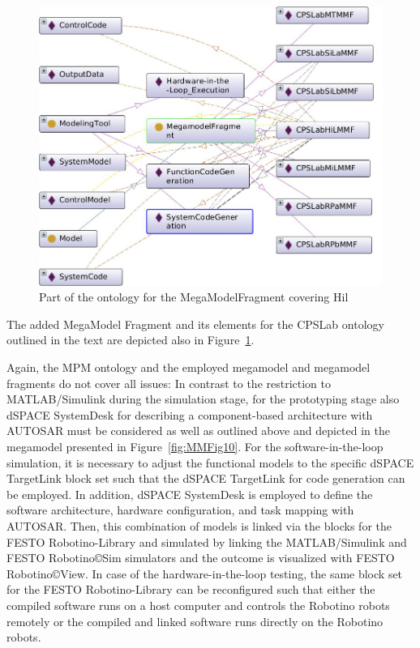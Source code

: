 
\begin{figure}[!htb]
\centering
\includegraphics[scale=0.333]{figures/CPSLabHiLMMF.jpg}
\caption{Part of the ontology for the MegaModelFragment \CPSLabHiLMMF covering Hil}
\label{fig:MMF-HPI-HiL}
\end{figure}

The added MegaModel Fragment \CPSLabHiLMMF and its elements for the CPSLab ontology outlined in the text are depicted also in Figure~\ref{fig:MMF-HPI-HiL}.


%
Again, the MPM ontology and the employed megamodel and megamodel fragments do not cover all issues: 
%
In contrast to the restriction to MATLAB/Simulink during the simulation stage, for the prototyping stage also dSPACE SystemDesk for describing a component-based architecture with AUTOSAR must be considered as well as outlined above and depicted in the megamodel presented in Figure~\ref{fig:MMFig10}.
%
For the software-in-the-loop simulation, it is necessary to adjust the functional models to the specific dSPACE TargetLink block set such that the dSPACE TargetLink for code generation can be employed. In addition, dSPACE SystemDesk is employed to define the software architecture, hardware configuration, and task mapping with AUTOSAR. Then, this combination of models is linked via the blocks for the FESTO Robotino-Library and simulated by linking the MATLAB/Simulink and FESTO Robotino{\copyright}Sim simulators and  the outcome is visualized with FESTO Robotino{\copyright}View. 
%
In case of the hardware-in-the-loop testing, the same block set for the FESTO Robotino-Library can be reconfigured such that 
%
either the compiled software runs on a host computer and controls the Robotino robots remotely
%
or the compiled and linked software runs directly on the Robotino robots.


